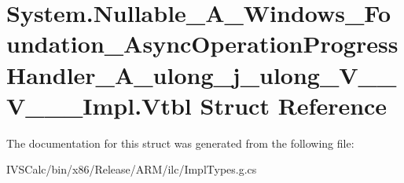 \hypertarget{struct_system_1_1_nullable___a___windows___foundation___async_operation_progress_handler___a__ul16c6202fff1f90d9ef782f2f2515cd29}{}\section{System.\+Nullable\+\_\+\+A\+\_\+\+Windows\+\_\+\+Foundation\+\_\+\+Async\+Operation\+Progress\+Handler\+\_\+\+A\+\_\+ulong\+\_\+j\+\_\+ulong\+\_\+\+V\+\_\+\+\_\+\+V\+\_\+\+\_\+\+\_\+\+Impl.\+Vtbl Struct Reference}
\label{struct_system_1_1_nullable___a___windows___foundation___async_operation_progress_handler___a__ul16c6202fff1f90d9ef782f2f2515cd29}


The documentation for this struct was generated from the following file\+:\begin{DoxyCompactItemize}
\item 
I\+V\+S\+Calc/bin/x86/\+Release/\+A\+R\+M/ilc/Impl\+Types.\+g.\+cs\end{DoxyCompactItemize}

